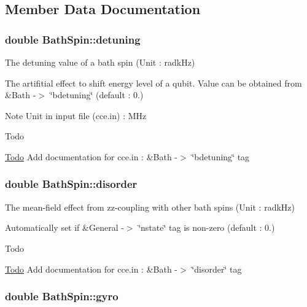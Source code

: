 \subsection{Member Data Documentation}
\hypertarget{structBathSpin_a045005fcc1f5517a81e47e4a8b30e2f4}{
\subsubsection[{detuning}]{\setlength{\rightskip}{0pt plus 5cm}double Bath\-Spin\-::detuning}}\label{structBathSpin_a045005fcc1f5517a81e47e4a8b30e2f4}


The detuning value of a bath spin (Unit \-: radk\-Hz) 

The artifitial effect to shift energy level of a qubit. Value can be obtained from \&Bath -\/$>$ \char`\"{}bdetuning\char`\"{} (default \-: 0.) \begin{DoxyNote}{Note}
Unit in input file (cce.\-in) \-: M\-Hz 
\end{DoxyNote}
\begin{DoxyRefDesc}{Todo}
\item[\hyperlink{todo__todo000006}{Todo}]Add documentation for cce.\-in \-: \&Bath -\/$>$ \char`\"{}bdetuning\char`\"{} tag \end{DoxyRefDesc}
\hypertarget{structBathSpin_aad59ec954d15643047790f148dcca39b}{
\subsubsection[{disorder}]{\setlength{\rightskip}{0pt plus 5cm}double Bath\-Spin\-::disorder}}\label{structBathSpin_aad59ec954d15643047790f148dcca39b}


The mean-\/field effect from zz-\/coupling with other bath spins (Unit \-: radk\-Hz) 

Automatically set if \&General -\/$>$ \char`\"{}nstate\char`\"{} tag is non-\/zero (default \-: 0.) \begin{DoxyRefDesc}{Todo}
\item[\hyperlink{todo__todo000007}{Todo}]Add documentation for cce.\-in \-: \&Bath -\/$>$ \char`\"{}disorder\char`\"{} tag \end{DoxyRefDesc}
\hypertarget{structBathSpin_a8c6487e73c2ef39b7a12d293ff5a1e4d}{
\subsubsection[{gyro}]{\setlength{\rightskip}{0pt plus 5cm}double Bath\-Spin\-::gyro}}\label{structBathSpin_a8c6487e73c2ef39b7a12d293ff5a1e4d}


